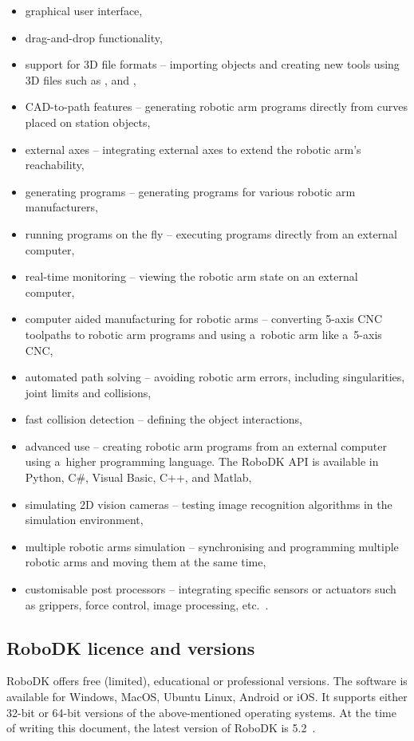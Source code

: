 \begin{itemize}
\item graphical user interface,
\item drag-and-drop functionality, 
\item support for 3D file formats -- importing objects and creating new tools using 3D files such as ,  and ,
\item CAD-to-path features -- generating robotic arm programs directly from curves placed on station objects,
\item external axes -- integrating external axes to extend the robotic arm’s reachability,
\item generating programs -- generating programs for various robotic arm manufacturers,
\item running programs on the fly -- executing programs directly from an external computer,
\item real-time monitoring -- viewing the robotic arm state on an external computer,
\item computer aided manufacturing for robotic arms -- converting 5-axis CNC toolpaths to robotic arm programs and using a~robotic arm like a~5-axis CNC,
\item automated path solving -- avoiding robotic arm errors, including singularities, joint limits and collisions,
\item fast collision detection -- defining the object interactions, 
\item advanced use -- creating robotic arm programs from an external computer using a~higher programming language. The RoboDK API is available in Python, C\#, Visual Basic, C++, and Matlab,
\item simulating 2D vision cameras -- testing image recognition algorithms in the simulation environment,
\item multiple robotic arms simulation -- synchronising and programming multiple robotic arms and moving them at the same time, 
\item customisable post processors -- integrating specific sensors or actuators such as grippers, force control, image processing, etc.~\cite{robodkfeatures}.
\end{itemize}

\subsection{RoboDK licence and versions}

RoboDK offers free (limited), educational or professional versions. 
The software is available for Windows, MacOS, Ubuntu Linux, Android or iOS. It supports either 32-bit or 64-bit versions of the above-mentioned operating systems. At the time of writing this document, the latest version of RoboDK is 5.2~\cite{robodkversions}. 

